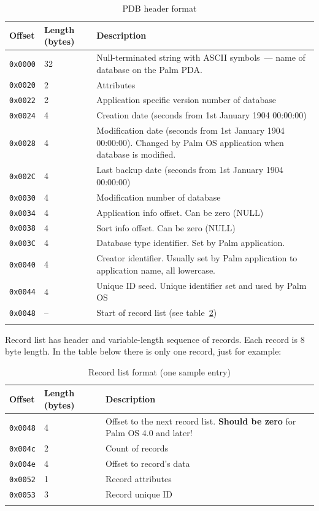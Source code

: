 \documentclass[a4paper,12pt,oneside]{scrartcl}
\begin{document}
\begin{longtable}{|p{2cm}|p{4cm}|p{7cm}|}
  \hline
  \textbf{Offset} & \textbf{Length (bytes)} & \textbf{Description} \\
  \hline
  \texttt{0x0000} & 32 & Null-terminated string with ASCII symbols~--- name of database on the Palm PDA. \\
  \hline
  \texttt{0x0020} & 2 & Attributes \\
  \hline
  \texttt{0x0022} & 2 & Application specific version number of database \\
  \hline
  \texttt{0x0024} & 4 & Creation date (seconds from 1st January 1904 00:00:00) \\
  \hline
  \texttt{0x0028} & 4 & Modification date (seconds from 1st January 1904 00:00:00). Changed by Palm OS application when database is modified. \\
  \hline
  \texttt{0x002C} & 4 & Last backup date (seconds from 1st January 1904 00:00:00) \\
  \hline
  \texttt{0x0030} & 4 & Modification number of database \\
  \hline
  \texttt{0x0034} & 4 & Application info offset. Can be zero (NULL) \\
  \hline
  \texttt{0x0038} & 4 & Sort info offset. Can be zero (NULL) \\
  \hline
  \texttt{0x003C} & 4 & Database type identifier. Set by Palm application. \\
  \hline
  \texttt{0x0040} & 4 & Creator identifier. Usually set by Palm application to application name, all lowercase. \\
  \hline
  \texttt{0x0044} & 4 & Unique ID seed. Unique identifier set and used by Palm OS \\
  \hline
  \texttt{0x0048} & -- & Start of record list (see table~\ref{tab:record-list-format}) \\
  \hline
  \caption{PDB header format}
  \label{tab:pdb-header-format}
\end{longtable}

Record list has header and variable-length sequence of records. Each record is 8
byte length. In the table below there is only one record, just for example:
\begin{longtable}{|p{2cm}|p{4cm}|p{7cm}|}
  \hline
  \textbf{Offset} & \textbf{Length (bytes)} & \textbf{Description} \\
  \hline
  \texttt{0x0048} & 4 & Offset to the next record list. \textbf{Should be zero} for Palm OS 4.0 and later! \\
  \hline
  \texttt{0x004c} & 2 & Count of records \\
  \hline
  \texttt{0x004e} & 4 & Offset to record's data \\
  \hline
  \texttt{0x0052} & 1 & Record attributes \\
  \hline
  \texttt{0x0053} & 3 & Record unique ID \\
  \hline
  \caption{Record list format (one sample entry)}
  \label{tab:record-list-format}
\end{longtable}
\end{document}
